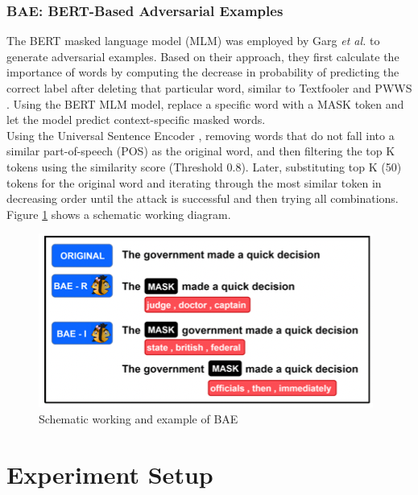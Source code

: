 \documentclass[%
	BCOR=8mm, %
	DIV=12,
	toc=bibliography, %
	toc=listof, %
	oneside, %
	egregdoesnotlikesansseriftitles, %
	]{scrbook}
\begin{document}
\subsection{BAE: BERT-Based Adversarial Examples}
\label{subsection:bae}
The BERT masked language model (MLM) was employed by Garg \textit{et al.} \cite{garg_bae_2020}  to generate adversarial examples. Based on their approach, they first calculate the importance of words by computing the decrease in probability of predicting the correct label after deleting that particular word, similar to Textfooler \cite{jia_certified_2019}  and PWWS \cite{ren_generating_2019}. Using the BERT MLM model, replace a specific word with a MASK token and let the model predict context-specific masked words. \\
Using the Universal Sentence Encoder \cite{cer_universal_2018},  removing words that do not fall into a similar part-of-speech (POS) as the original word, and then filtering the top K tokens using the similarity score (Threshold 0.8). Later, substituting top K (50) tokens for the original word and iterating through the most similar token in decreasing order until the attack is successful and then trying all combinations. Figure \ref{diag:baeexp} shows a schematic working diagram.
\begin{figure}[H]
    \centering
    \includegraphics[width=.59\textwidth]{img/BAEexample.png}
    \caption[Schematic working and example of BAE attack recipe]{Schematic working and example of BAE \cite{garg_bae_2020} }
    \label{diag:baeexp}
\end{figure}
 
\chapter{Experiment Setup}
\label{chapter:experiment}
\end{document}
